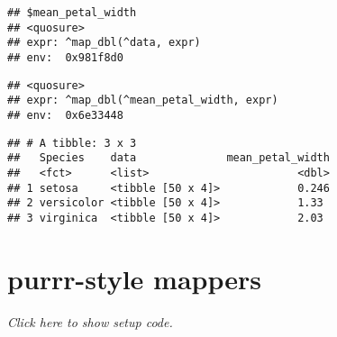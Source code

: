 \documentclass[]{book}
\newenvironment{Shaded}{\begin{snugshade}}{\end{snugshade}}
\newcommand{\ControlFlowTok}[1]{\textcolor[rgb]{0.13,0.29,0.53}{\textbf{#1}}}
\newcommand{\DataTypeTok}[1]{\textcolor[rgb]{0.13,0.29,0.53}{#1}}
\newcommand{\KeywordTok}[1]{\textcolor[rgb]{0.13,0.29,0.53}{\textbf{#1}}}
\newcommand{\NormalTok}[1]{#1}
\newcommand{\OperatorTok}[1]{\textcolor[rgb]{0.81,0.36,0.00}{\textbf{#1}}}
\newcommand{\StringTok}[1]{\textcolor[rgb]{0.31,0.60,0.02}{#1}}
\begin{document}
\begin{verbatim}
## $mean_petal_width
## <quosure>
## expr: ^map_dbl(^data, expr)
## env:  0x981f8d0
\end{verbatim}

\begin{Shaded}
\end{Shaded}

\begin{verbatim}
## <quosure>
## expr: ^map_dbl(^mean_petal_width, expr)
## env:  0x6e33448
\end{verbatim}

\begin{Shaded}
\end{Shaded}

\begin{verbatim}
## # A tibble: 3 x 3
##   Species    data              mean_petal_width
##   <fct>      <list>                       <dbl>
## 1 setosa     <tibble [50 x 4]>            0.246
## 2 versicolor <tibble [50 x 4]>            1.33 
## 3 virginica  <tibble [50 x 4]>            2.03
\end{verbatim}

\hypertarget{purrr-style-mappers}{%
\section{purrr-style mappers}\label{purrr-style-mappers}}

\emph{Click here to show setup code.}

\begin{Shaded}
\end{Shaded}
\end{document}
